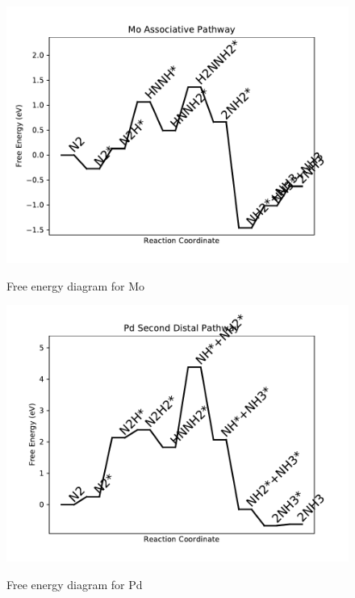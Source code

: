 \documentclass{article}
\begin{document}
\newpage
\begin{figure}
\includegraphics[width=1\linewidth]{data/plots/Mo_associative.pdf}
\label{fig:Mo_associative}
\caption{Free energy diagram for Mo}
\end{figure}

\begin{figure}
\includegraphics[width=1\linewidth]{data/plots/Pd_distal_2.pdf}
\label{fig:Pd_distal_2}
\caption{Free energy diagram for Pd}
\end{figure}
\end{document}
